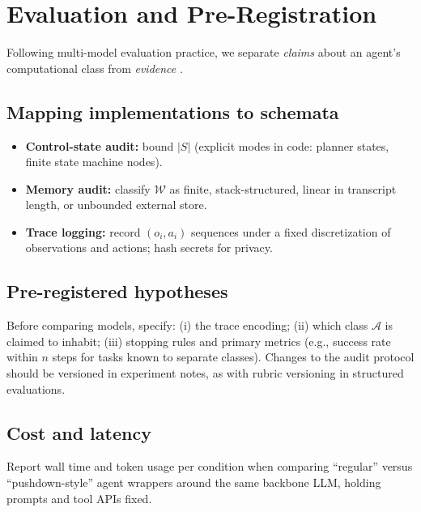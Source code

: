 \section{Evaluation and Pre-Registration}
\label{sec:eval}

Following multi-model evaluation practice, we separate \emph{claims} about an agent's computational class from \emph{evidence} \citep{russell2020aima}.

\subsection{Mapping implementations to schemata}

\begin{itemize}
  \item \textbf{Control-state audit:} bound $|S|$ (explicit modes in code: planner states, finite state machine nodes).
  \item \textbf{Memory audit:} classify $\mathcal{W}$ as finite, stack-structured, linear in transcript length, or unbounded external store.
  \item \textbf{Trace logging:} record $(o_i,a_i)$ sequences under a fixed discretization of observations and actions; hash secrets for privacy.
\end{itemize}

\subsection{Pre-registered hypotheses}

Before comparing models, specify: (i) the trace encoding; (ii) which class $\mathcal{A}$ is claimed to inhabit; (iii) stopping rules and primary metrics (e.g., success rate within $n$ steps for tasks known to separate classes). Changes to the audit protocol should be versioned in experiment notes, as with rubric versioning in structured evaluations.

\subsection{Cost and latency}

Report wall time and token usage per condition when comparing ``regular'' versus ``pushdown-style'' agent wrappers around the same backbone LLM, holding prompts and tool APIs fixed.
